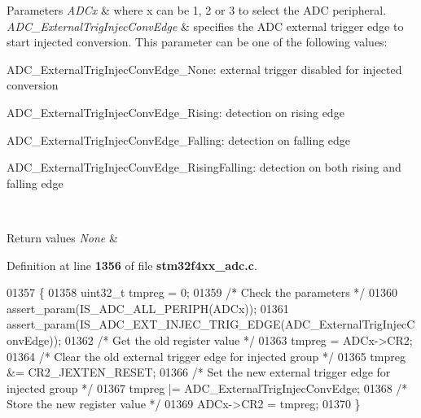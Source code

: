 \begin{DoxyParams}{Parameters}
{\em A\+D\+Cx} & where x can be 1, 2 or 3 to select the A\+DC peripheral. \\
\hline
{\em A\+D\+C\+\_\+\+External\+Trig\+Injec\+Conv\+Edge} & specifies the A\+DC external trigger edge to start injected conversion. This parameter can be one of the following values\+: \begin{DoxyItemize}
\item A\+D\+C\+\_\+\+External\+Trig\+Injec\+Conv\+Edge\+\_\+\+None\+: external trigger disabled for injected conversion \item A\+D\+C\+\_\+\+External\+Trig\+Injec\+Conv\+Edge\+\_\+\+Rising\+: detection on rising edge \item A\+D\+C\+\_\+\+External\+Trig\+Injec\+Conv\+Edge\+\_\+\+Falling\+: detection on falling edge \item A\+D\+C\+\_\+\+External\+Trig\+Injec\+Conv\+Edge\+\_\+\+Rising\+Falling\+: detection on both rising and falling edge \end{DoxyItemize}
\\
\hline
\end{DoxyParams}

\begin{DoxyRetVals}{Return values}
{\em None} & \\
\hline
\end{DoxyRetVals}


Definition at line \textbf{ 1356} of file \textbf{ stm32f4xx\+\_\+adc.\+c}.


\begin{DoxyCode}
01357 \{
01358   uint32\_t tmpreg = 0;
01359   \textcolor{comment}{/* Check the parameters */}
01360   assert_param(IS_ADC_ALL_PERIPH(ADCx));
01361   assert_param(IS_ADC_EXT_INJEC_TRIG_EDGE(ADC\_ExternalTrigInjecConvEdge));
01362   \textcolor{comment}{/* Get the old register value */}
01363   tmpreg = ADCx->CR2;
01364   \textcolor{comment}{/* Clear the old external trigger edge for injected group */}
01365   tmpreg &= CR2_JEXTEN_RESET;
01366   \textcolor{comment}{/* Set the new external trigger edge for injected group */}
01367   tmpreg |= ADC\_ExternalTrigInjecConvEdge;
01368   \textcolor{comment}{/* Store the new register value */}
01369   ADCx->CR2 = tmpreg;
01370 \}
\end{DoxyCode}
\mbox{\label{group__ADC__Group6_ga1dea5ed24571a2e0ce4cbd41c9c1ec46}} 
